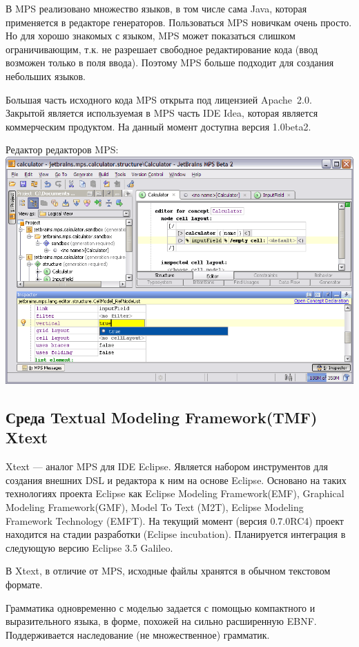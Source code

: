 \documentclass[a4paper,12pt,titlepage]{extarticle}
\begin{document}
В MPS реализовано множество языков, в том числе сама Java, которая применяется
в редакторе генераторов. Пользоваться MPS новичкам очень просто. Но для хорошо
знакомых с языком, MPS может показаться слишком ограничивающим, т.к. не
разрешает свободное редактирование кода (ввод возможен только в поля ввода).
Поэтому MPS больше подходит для создания небольших языков.

Большая часть исходного кода MPS открыта под лицензией Apache~2.0. Закрытой
является используемая в MPS часть IDE Idea, которая является коммерческим
продуктом.
На данный момент доступна версия 1.0beta2.

\begin{center}
Редактор редакторов MPS:\\
\includegraphics[scale=0.4]{img/mps.png}
\end{center}

\subsection{Среда Textual Modeling Framework(TMF) Xtext}
Xtext --- аналог MPS для IDE Eclipse. Является набором инструментов для
создания внешних DSL и редактора к ним на основе Eclipse. Основано на
таких технологиях проекта Eclipse как Eclipse Modeling Framework(EMF),
Graphical Modeling Framework(GMF), Model To Text (M2T), Eclipse Modeling
Framework Technology (EMFT). На текущий момент (версия 0.7.0RC4) проект
находится на стадии разработки (Eclipse incubation). Планируется интеграция в следующую
версию Eclipse 3.5 Galileo.

В Xtext, в отличие от MPS, исходные файлы хранятся в обычном текстовом формате.

Грамматика одновременно с моделью задается с помощью компактного и
выразительного языка, в форме, похожей на сильно расширенную EBNF.
Поддерживается наследование (не множественное) грамматик.
\end{document}

